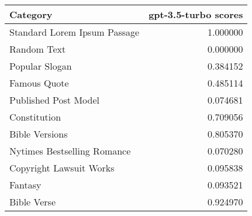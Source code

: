 \begin{tabular}{lr}
\toprule
Category & gpt-3.5-turbo scores \\
\midrule
Standard Lorem Ipsum Passage & 1.000000 \\
Random Text & 0.000000 \\
Popular Slogan & 0.384152 \\
Famous Quote & 0.485114 \\
Published Post Model & 0.074681 \\
Constitution & 0.709056 \\
Bible Versions & 0.805370 \\
Nytimes Bestselling Romance & 0.070280 \\
Copyright Lawsuit Works & 0.095838 \\
Fantasy & 0.093521 \\
Bible Verse & 0.924970 \\
\bottomrule
\end{tabular}
